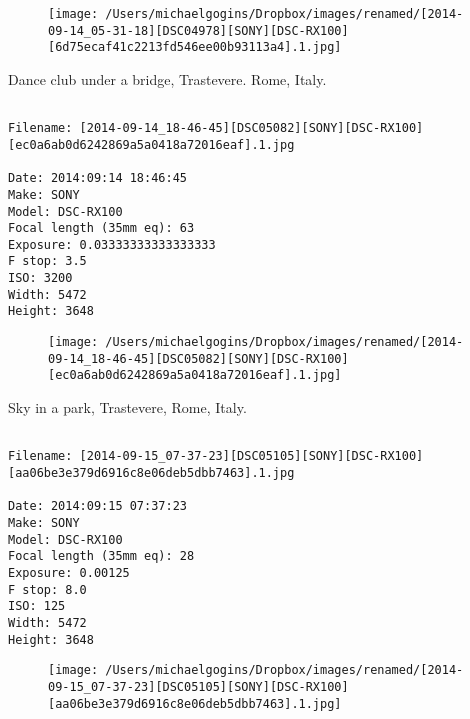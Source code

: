 \documentclass[11pt,letter,DIV=14,paper=landscape]{scrbook}
\begin{document}
\begin{figure}
\texttt{[image: /Users/michaelgogins/Dropbox/images/renamed/[2014-09-14\_05-31-18][DSC04978][SONY][DSC-RX100][6d75ecaf41c2213fd546ee00b93113a4].1.jpg]}
\end{figure}
    
\clearpage
\noindent Dance club under a bridge, Trastevere. Rome, Italy.
\noindent
\begin{lstlisting}

Filename: [2014-09-14_18-46-45][DSC05082][SONY][DSC-RX100][ec0a6ab0d6242869a5a0418a72016eaf].1.jpg

Date: 2014:09:14 18:46:45
Make: SONY
Model: DSC-RX100
Focal length (35mm eq): 63
Exposure: 0.03333333333333333
F stop: 3.5
ISO: 3200
Width: 5472
Height: 3648
\end{lstlisting}
\clearpage

\begin{figure}
\texttt{[image: /Users/michaelgogins/Dropbox/images/renamed/[2014-09-14\_18-46-45][DSC05082][SONY][DSC-RX100][ec0a6ab0d6242869a5a0418a72016eaf].1.jpg]}
\end{figure}
    
\clearpage
\noindent Sky in a park, Trastevere, Rome, Italy.
\noindent
\begin{lstlisting}

Filename: [2014-09-15_07-37-23][DSC05105][SONY][DSC-RX100][aa06be3e379d6916c8e06deb5dbb7463].1.jpg

Date: 2014:09:15 07:37:23
Make: SONY
Model: DSC-RX100
Focal length (35mm eq): 28
Exposure: 0.00125
F stop: 8.0
ISO: 125
Width: 5472
Height: 3648
\end{lstlisting}
\clearpage

\begin{figure}
\texttt{[image: /Users/michaelgogins/Dropbox/images/renamed/[2014-09-15\_07-37-23][DSC05105][SONY][DSC-RX100][aa06be3e379d6916c8e06deb5dbb7463].1.jpg]}
\end{figure}
    
\end{document}
